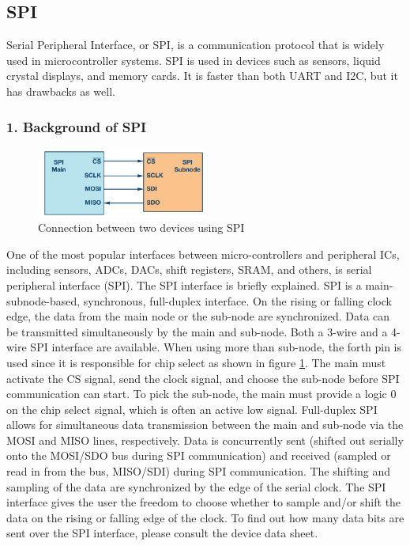 \subsection{SPI}
Serial Peripheral Interface, or SPI, is a communication protocol that is widely used in microcontroller systems. SPI is used in devices such as sensors, liquid crystal displays, and memory cards. It is faster than both UART and I2C, but it has drawbacks as well.
\subsubsection{1. Background of SPI}
\begin{figure}
    \includegraphics[width=0.5\textwidth]{figure/3_6.png}
    \caption{Connection between two devices using SPI}
    \label{fig:connection-spi}
\end{figure}
One of the most popular interfaces between micro-controllers and peripheral ICs, including sensors, ADCs, DACs, shift registers, SRAM, and others, is serial peripheral interface (SPI). The SPI interface is briefly explained. SPI is a main-subnode-based, synchronous, full-duplex interface. On the rising or falling clock edge, the data from the main node or the sub-node are synchronized. Data can be transmitted simultaneously by the main and sub-node. Both a 3-wire and a 4-wire SPI interface are available. When using more than sub-node, the forth pin is used since it is responsible for chip select as shown in figure \ref{fig:connection-spi}.\newline
The main must activate the CS signal, send the clock signal, and choose the sub-node before SPI communication can start. To pick the sub-node, the main must provide a logic 0 on the chip select signal, which is often an active low signal. Full-duplex SPI allows for simultaneous data transmission between the main and sub-node via the MOSI and MISO lines, respectively. Data is concurrently sent (shifted out serially onto the MOSI/SDO bus during SPI communication) and received (sampled or read in from the bus, MISO/SDI) during SPI communication. \newline
The shifting and sampling of the data are synchronized by the edge of the serial clock. The SPI interface gives the user the freedom to choose whether to sample and/or shift the data on the rising or falling edge of the clock. To find out how many data bits are sent over the SPI interface, please consult the device data sheet.

